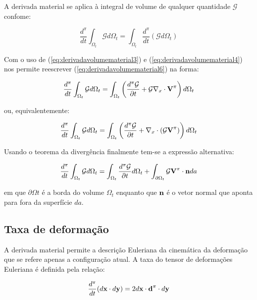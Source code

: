 \documentclass[
	11pt, %
	fleqn, %
	a4paper, %
]{LegrandOrangeBook}
\begin{document}
A derivada material se aplica à integral de volume de qualquer quantidade $\mathcal{G}$ confome:

\begin{equation}
	\label{eq:derivadavolumematerial6}	
	\dfrac{d^\pi}{dt}\int_{\Omega_t}\mathcal{G}d\Omega_t = \int_{\Omega_t}\dfrac{d^\pi}{dt}(\mathcal{G}d\Omega_t)
\end{equation}

Com o uso de (\ref{eq:derivadavolumematerial3}) e (\ref{eq:derivadavolumematerial4}) nos permite reescrever (\ref{eq:derivadavolumematerial6}) na forma:

\begin{equation}
	\label{eq:derivadavolumematerial7}	
	\dfrac{d^\pi}{dt}\int_{\Omega_t}\mathcal{G}d\Omega_t = \int_{\Omega_t}\left(\dfrac{d^\pi \mathcal{G}}{\partial t}+\mathcal{G}\nabla_x \cdot \textbf{V}^{\pi}\right)d\Omega_t
\end{equation}

ou, equivalentemente:

\begin{equation}
	\label{eq:derivadavolumematerial8}	
	\dfrac{d^\pi}{dt}\int_{\Omega_t}\mathcal{G}d\Omega_t = \int_{\Omega_t}\left(\dfrac{d^\pi \mathcal{G}}{\partial t}+\nabla_x \cdot (\mathcal{G}\textbf{V}^{\pi})\right)d\Omega_t
\end{equation}

Usando o teorema da divergência finalmente tem-se a expressão alternativa:

\begin{equation}
	\label{eq:derivadavolumematerial9}	
	\dfrac{d^\pi}{dt}\int_{\Omega_t}\mathcal{G}d\Omega_t = \int_{\Omega_t}\dfrac{d^\pi \mathcal{G}}{\partial t}d\Omega_t+\int_{\partial \Omega_t} \mathcal{G}\textbf{V}^{\pi} \cdot \textbf{n} da
\end{equation}

em que $\partial \Omega t$ é a borda do volume $\Omega_t$ enquanto que $\textbf{n}$ é o vetor normal que aponta para fora da superfície $da$.

\subsection{Taxa de deformação}

A derivada material permite a descrição Euleriana da cinemática da deformação que se refere apenas a configuração atual. A taxa do tensor de deformações Euleriana é definida pela relação:

\begin{equation}
	\label{eq:taxadedeformacaoeuleriana1}	
	\dfrac{d^\pi}{dt}(d\textbf{x} \cdot d\textbf{y}) = 2d\textbf{x} \cdot \textbf{d}^{\pi} \cdot d\textbf{y}
\end{equation}
\end{document}

